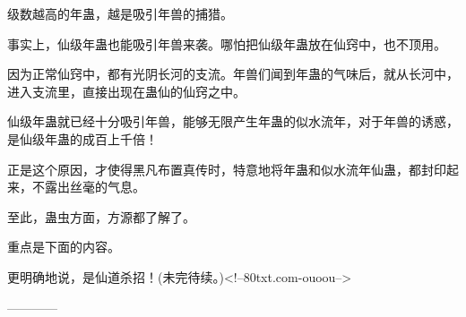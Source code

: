 \begin{this_body}
级数越高的年蛊，越是吸引年兽的捕猎。

事实上，仙级年蛊也能吸引年兽来袭。哪怕把仙级年蛊放在仙窍中，也不顶用。

因为正常仙窍中，都有光阴长河的支流。年兽们闻到年蛊的气味后，就从长河中，进入支流里，直接出现在蛊仙的仙窍之中。

仙级年蛊就已经十分吸引年兽，能够无限产生年蛊的似水流年，对于年兽的诱惑，是仙级年蛊的成百上千倍！

正是这个原因，才使得黑凡布置真传时，特意地将年蛊和似水流年仙蛊，都封印起来，不露出丝毫的气息。

至此，蛊虫方面，方源都了解了。

重点是下面的内容。

更明确地说，是仙道杀招！(未完待续。)<!--80txt.com-ouoou-->

------------

\end{this_body}

